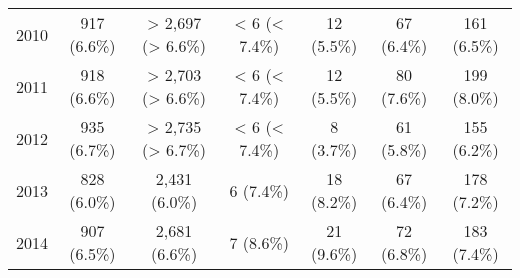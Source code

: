 \documentclass{article}
\begin{document}
\begin{table}[htbp]
\begin{tabular}{l*{6}{c}}
  2010                                                  &           917 (6.6\%)           &        > 2,697 (> 6.6\%)        &          < 6 (< 7.4\%)          &            12 (5.5\%)           &            67 (6.4\%)           &           161 (6.5\%)           \\
  2011                                                  &           918 (6.6\%)           &        > 2,703 (> 6.6\%)        &          < 6 (< 7.4\%)          &            12 (5.5\%)           &            80 (7.6\%)           &           199 (8.0\%)           \\
  2012                                                  &           935 (6.7\%)           &        > 2,735 (> 6.7\%)        &          < 6 (< 7.4\%)          &            8 (3.7\%)            &            61 (5.8\%)           &           155 (6.2\%)           \\
  2013                                                  &           828 (6.0\%)           &          2,431 (6.0\%)          &            6 (7.4\%)            &            18 (8.2\%)           &            67 (6.4\%)           &           178 (7.2\%)           \\
  2014                                                  &           907 (6.5\%)           &          2,681 (6.6\%)          &            7 (8.6\%)            &            21 (9.6\%)           &            72 (6.8\%)           &           183 (7.4\%)           \\

\bottomrule
\end{tabular}
\label{table:mr}
\end{table}
\end{document}
